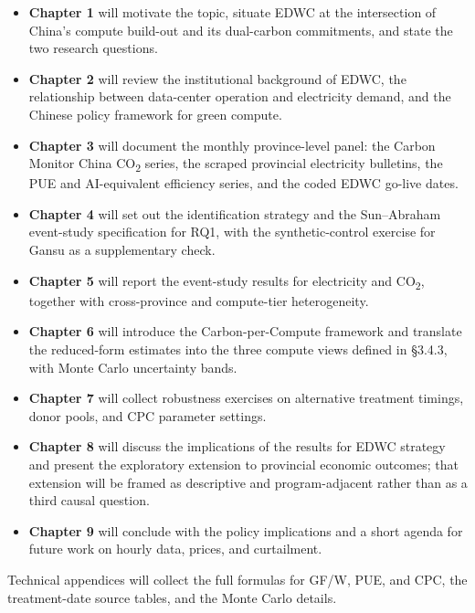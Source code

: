 \documentclass[12pt,a4paper]{article}
\begin{document}
\begin{itemize}
  \item \textbf{Chapter 1} will motivate the topic, situate EDWC at
        the intersection of China's compute build-out and its
        dual-carbon commitments, and state the two research questions.
  \item \textbf{Chapter 2} will review the institutional background
        of EDWC, the relationship between data-center operation and
        electricity demand, and the Chinese policy framework for
        green compute.
  \item \textbf{Chapter 3} will document the monthly province-level
        panel: the Carbon Monitor China CO\textsubscript{2} series,
        the scraped provincial electricity bulletins, the PUE and
        AI-equivalent efficiency series, and the coded EDWC go-live
        dates.
  \item \textbf{Chapter 4} will set out the identification strategy
        and the Sun--Abraham event-study specification for RQ1, with
        the synthetic-control exercise for Gansu as a supplementary
        check.
  \item \textbf{Chapter 5} will report the event-study results for
        electricity and CO\textsubscript{2}, together with
        cross-province and compute-tier heterogeneity.
  \item \textbf{Chapter 6} will introduce the Carbon-per-Compute
        framework and translate the reduced-form estimates into the
        three compute views defined in §3.4.3, with Monte Carlo
        uncertainty bands.
  \item \textbf{Chapter 7} will collect robustness exercises on
        alternative treatment timings, donor pools, and CPC
        parameter settings.
  \item \textbf{Chapter 8} will discuss the implications of the
        results for EDWC strategy and present the exploratory
        extension to provincial economic outcomes; that extension
        will be framed as descriptive and program-adjacent rather
        than as a third causal question.
  \item \textbf{Chapter 9} will conclude with the policy implications
        and a short agenda for future work on hourly data, prices,
        and curtailment.
\end{itemize}

Technical appendices will collect the full formulas for GF/W, PUE,
and CPC, the treatment-date source tables, and the Monte Carlo
details.
\end{document}
